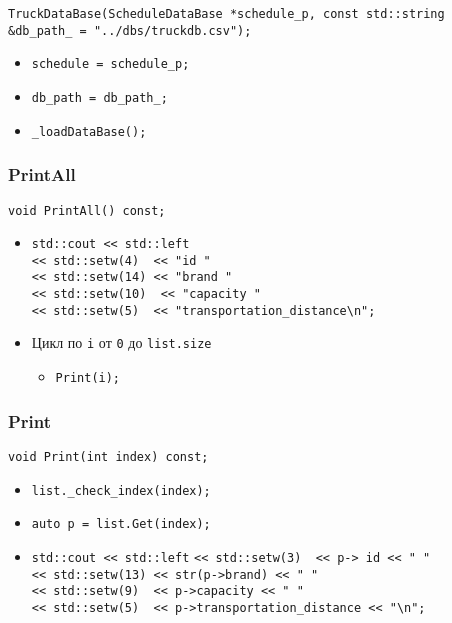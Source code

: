 \begin{lstlisting}
TruckDataBase(ScheduleDataBase *schedule_p, const std::string &db_path_ = "../dbs/truckdb.csv");
\end{lstlisting}

\begin{itemize}
	\item \verb|schedule = schedule_p;|
	\item \verb|db_path = db_path_;|
	\item \verb|_loadDataBase();|
\end{itemize}

\subsubsection*{PrintAll}

\begin{lstlisting}
void PrintAll() const;
\end{lstlisting}

\begin{itemize}
	\item \verb|std::cout << std::left|\\
	\verb|<< std::setw(4)  << "id "|\\
	\verb|<< std::setw(14) << "brand "|\\
	\verb|<< std::setw(10)  << "capacity "|\\
	\verb|<< std::setw(5)  << "transportation_distance\n";|
	\item Цикл по \verb|i| от \verb|0| до \verb|list.size| 
	\begin{itemize}
		\item \verb|Print(i);|
	\end{itemize}
\end{itemize}

\subsubsection*{Print}

\begin{lstlisting}
void Print(int index) const;
\end{lstlisting}

\begin{itemize}
	\item \verb|list._check_index(index);|
	\item \verb|auto p = list.Get(index);|
	\item \verb|std::cout << std::left|
	\verb|<< std::setw(3)  << p-> id << " "|\\
	\verb|<< std::setw(13) << str(p->brand) << " "|\\
	\verb|<< std::setw(9)  << p->capacity << " "|\\
	\verb|<< std::setw(5)  << p->transportation_distance << "\n";|
\end{itemize}

